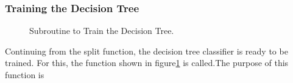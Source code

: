 \subsubsection{Training the Decision Tree}

\begin{figure}[H]
	\centering
	\caption{Subroutine to Train the Decision Tree.}
	\label{fig:dtt}
\end{figure}
Continuing from the split function, the decision tree classifier is ready to be trained. For this, the function shown in figure\ref{fig:dtt} is called.The purpose of this function is 

